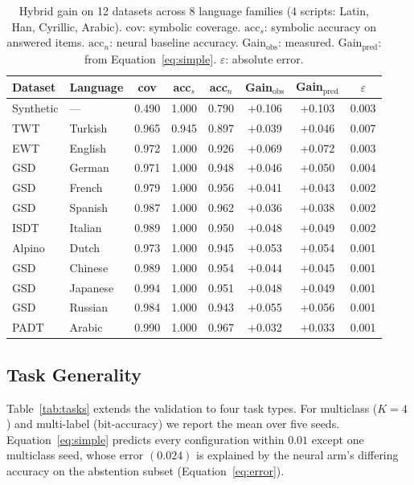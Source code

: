 \documentclass[11pt,a4paper]{article}
\begin{document}
\begin{table}[h]
\centering
\caption{Hybrid gain on 12 datasets across 8 language families (4 scripts: Latin, Han, Cyrillic, Arabic).
$\text{cov}$: symbolic coverage. $\text{acc}_s$: symbolic accuracy on
answered items. $\text{acc}_n$: neural baseline accuracy.
Gain$_\text{obs}$: measured. Gain$_\text{pred}$: from
Equation~\ref{eq:simple}. $\varepsilon$: absolute error.}
\label{tab:8lang}
\small
\begin{tabular}{llcccccc}
\toprule
Dataset & Language & cov & acc$_s$ & acc$_n$ & Gain$_\text{obs}$ & Gain$_\text{pred}$ & $\varepsilon$ \\
\midrule
Synthetic & --- & 0.490 & 1.000 & 0.790 & +0.106 & +0.103 & 0.003 \\
TWT & Turkish & 0.965 & 0.945 & 0.897 & +0.039 & +0.046 & 0.007 \\
EWT & English & 0.972 & 1.000 & 0.926 & +0.069 & +0.072 & 0.003 \\
GSD & German & 0.971 & 1.000 & 0.948 & +0.046 & +0.050 & 0.004 \\
GSD & French & 0.979 & 1.000 & 0.956 & +0.041 & +0.043 & 0.002 \\
GSD & Spanish & 0.987 & 1.000 & 0.962 & +0.036 & +0.038 & 0.002 \\
ISDT & Italian & 0.989 & 1.000 & 0.950 & +0.048 & +0.049 & 0.002 \\
Alpino & Dutch & 0.973 & 1.000 & 0.945 & +0.053 & +0.054 & 0.001 \\
GSD & Chinese  & 0.989 & 1.000 & 0.954 & +0.044 & +0.045 & 0.001 \\
GSD & Japanese & 0.994 & 1.000 & 0.951 & +0.048 & +0.049 & 0.001 \\
GSD & Russian  & 0.984 & 1.000 & 0.943 & +0.055 & +0.056 & 0.001 \\
PADT & Arabic  & 0.990 & 1.000 & 0.967 & +0.032 & +0.033 & 0.001 \\
\bottomrule
\end{tabular}
\end{table}

\subsection{Task Generality}

Table~\ref{tab:tasks} extends the validation to four task types.
For multiclass ($K=4$) and multi-label (bit-accuracy) we report
the mean over five seeds. Equation~\ref{eq:simple} predicts every
configuration within $0.01$ except one multiclass seed, whose error
$(0.024)$ is explained by the neural arm's differing accuracy on
the abstention subset (Equation~\ref{eq:error}).
\end{document}
